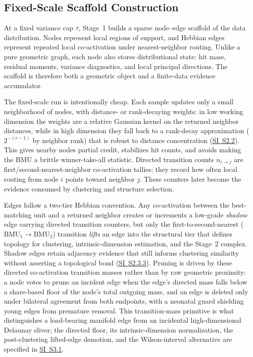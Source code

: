 \documentclass[11pt]{article}
\theoremstyle{definition}
\theoremstyle{plain}
\begin{document}
\subsection{Fixed-Scale Scaffold Construction}
At a fixed variance cap $\tau$, Stage~1 builds a sparse node--edge scaffold of the data distribution. Nodes represent local regions of support, and Hebbian edges represent repeated local co-activation under nearest-neighbor routing. Unlike a pure geometric graph, each node also stores distributional state: hit mass, residual moments, variance diagnostics, and local principal directions. The scaffold is therefore both a geometric object and a finite-data evidence accumulator.

The fixed-scale run is intentionally cheap. Each sample updates only a small neighborhood of nodes, with distance- or rank-decaying weights: in low working dimension the weights are a relative Gaussian kernel on the returned neighbor distances, while in high dimension they fall back to a rank-decay approximation ($2^{-(r-1)}$ by neighbor rank) that is robust to distance concentration (\hyperref[sec:si-neighbor-weights]{SI~S2.2}). This gives nearby nodes partial credit, stabilizes hit counts, and avoids making the BMU a brittle winner-take-all statistic. Directed transition counts $n_{i\to j}$ are first/second-nearest-neighbor co-activation tallies: they record how often local routing from node $i$ points toward neighbor $j$. These counters later become the evidence consumed by clustering and structure selection.

Edges follow a two-tier Hebbian convention. Any co-activation between the best-matching unit and a returned neighbor creates or increments a low-grade \emph{shadow} edge carrying directed transition counters, but only the first-to-second-nearest ($\mathrm{BMU}_1\!\to\!\mathrm{BMU}_2$) transition \emph{lifts} an edge into the structural tier that defines topology for clustering, intrinsic-dimension estimation, and the Stage~2 complex. Shadow edges retain adjacency evidence that still informs clustering similarity without asserting a topological bond (\hyperref[sec:si-two-tier-edges]{SI~S2.3.3}). Pruning is driven by these directed co-activation transition masses rather than by raw geometric proximity: a node votes to prune an incident edge when the edge's directed mass falls below a share-based floor of the node's total outgoing mass, and an edge is deleted only under bilateral agreement from both endpoints, with a neonatal guard shielding young edges from premature removal. This transition-mass primitive is what distinguishes a load-bearing manifold edge from an incidental high-dimensional Delaunay sliver; the directed floor, its intrinsic-dimension normalization, the post-clustering lifted-edge demotion, and the Wilson-interval alternative are specified in \hyperref[sec:si-link-pruning]{SI~S3.1}.
\end{document}

